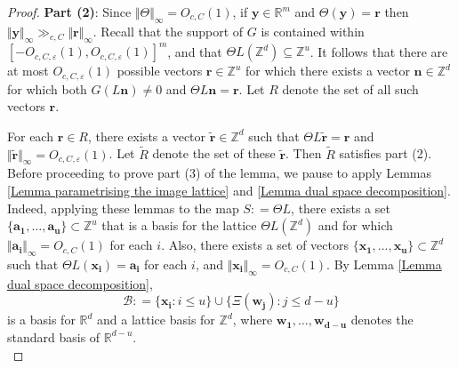 \documentclass[12pt,a4paper,twoside,reqno]{amsart}
\numberwithin{equation}{section}
\begin{document}
\begin{proof}
\textbf{Part (2)}: Since $\Vert \Theta \Vert_\infty = O_{c,C}(1)$, if $\mathbf{y} \in\mathbb{R}^m$ and $\Theta(\mathbf{y}) = \mathbf{r}$ then  $ \Vert \mathbf{y} \Vert_\infty \gg_{c,C} \Vert\mathbf{r} \Vert_\infty$. Recall that the support of $G$ is contained within $[-O_{c,C,\varepsilon}(1),O_{c,C,\varepsilon}(1)]^m$, and that $\Theta L(\mathbb{Z}^d) \subseteq \mathbb{Z}^u$. It follows that there are at most $O_{c,C,\varepsilon}(1)$ possible vectors $\mathbf{r} \in \mathbb{Z}^u$ for which there exists a vector $\mathbf{n} \in\mathbb{Z}^d$ for which both $G(L\mathbf{n}) \neq 0$ and $\Theta L \mathbf{n} = \mathbf{r}$. Let $R$ denote the set of all such vectors $\mathbf{r}$. 

For each $\mathbf{r} \in R$, there exists a vector $\widetilde{\mathbf{r}}\in \mathbb{Z}^d$ such that $\Theta L \widetilde{\mathbf{r}} = \mathbf{r}$ and $\Vert \widetilde{\mathbf{r}} \Vert_\infty = O_{c,C,\varepsilon}(1)$. Let $\widetilde{R}$ denote the set of these $\widetilde{\mathbf{r}}$. Then $\widetilde{R}$ satisfies part (2).\\

Before proceeding to prove part (3) of the lemma, we pause to apply Lemmas \ref{Lemma parametrising the image lattice} and \ref{Lemma dual space decomposition}. Indeed, applying these lemmas to the map $S: = \Theta L$, there exists a set $\{ \mathbf{a_1},\dots,\mathbf{a_u}\} \subset \mathbb{Z}^u$ that is a basis for the lattice $\Theta L(\mathbb{Z}^d)$ and for which $\Vert \mathbf{a_i}\Vert_\infty = O_{c,C}(1)$ for each $i$. Also, there exists a set of vectors $\{ \mathbf{x_1},\dots,\mathbf{x_u}\} \subset \mathbb{Z}^d$ such that $\Theta L(\mathbf{x_i})= \mathbf{a_i}$ for each $i$, and $\Vert \mathbf{x_i}\Vert_\infty = O_{c,C}(1)$. By Lemma \ref{Lemma dual space decomposition}, 
\begin{equation}
\label{basis for Rd}
 \mathcal{B}: = \{\mathbf{x_i}:i\leqslant u\} \cup \{ \Xi(\mathbf{w_j}):j\leqslant d-u\}
 \end{equation} is a basis for $\mathbb{R}^d$ and a lattice basis for $\mathbb{Z}^d$, where $\mathbf{w_1},\dots,\mathbf{w_{d-u}}$ denotes the standard basis of $\mathbb{R}^{d-u}$.\\ 





\end{proof}
\end{document}
